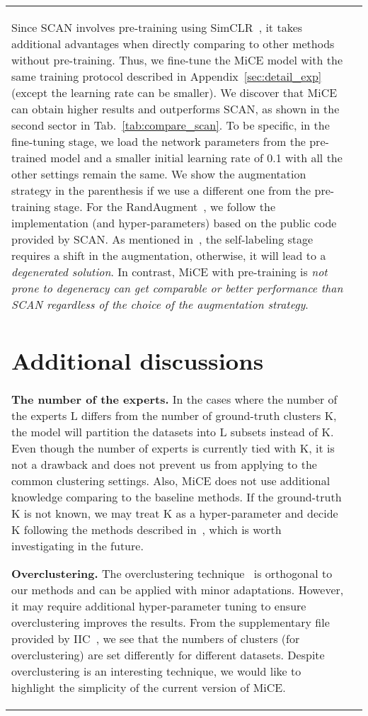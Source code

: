 \documentclass{article} \usepackage{iclr2021_conference,times}
\begin{document}
\begin{table}[t]
\begin{subtable}[h]{0.49\textwidth}
{\begin{tabular}{@{}lc@{}}
Since SCAN involves pre-training using SimCLR~\citep{chen2020simple}, it takes additional advantages when directly comparing to other methods without pre-training. Thus, we fine-tune the MiCE model with the same training protocol described in Appendix~\ref{sec:detail_exp} (except the learning rate can be smaller). We discover that MiCE can obtain higher results and outperforms SCAN, as shown in the second sector in Tab.~\ref{tab:compare_scan}. To be specific, in the fine-tuning stage, we load the network parameters from the pre-trained model and a smaller initial learning rate of 0.1 with all the other settings remain the same. We show the augmentation strategy in the parenthesis if we use a different one from the pre-training stage. For the RandAugment~\citep{cubuk2020randaugment}, we follow the implementation (and hyper-parameters) based on the public code provided by SCAN. As mentioned in~\citet{van2020scan}, the self-labeling stage requires a shift in the augmentation, otherwise, it will lead to a \textit{degenerated solution}. In contrast, MiCE with pre-training is \textit{not prone to degeneracy can get comparable or better performance than SCAN regardless of the choice of the augmentation strategy}.












\section{Additional discussions}

{\bf The number of the experts.} In the cases where the number of the experts L differs from the number of ground-truth clusters K, the model will partition the datasets into L subsets instead of K. Even though the number of experts is currently tied with K, it is not a drawback and does not prevent us from applying to the common clustering settings. Also, MiCE does not use additional knowledge comparing to the baseline methods. If the ground-truth K is not known, we may treat K as a hyper-parameter and decide K following the methods described in~\citet{smyth2000model,mclachlan2004finite}, which is worth investigating in the future.

{\bf Overclustering.} The overclustering technique~\citep{ji2019invariant} is orthogonal to our methods and can be applied with minor adaptations. However, it may require additional hyper-parameter tuning to ensure overclustering improves the results. From the supplementary file provided by IIC~\citep{ji2019invariant}, we see that the numbers of clusters (for overclustering) are set differently for different datasets. Despite overclustering is an interesting technique, we would like to highlight the simplicity of the current version of MiCE.  


\end{tabular}}
\end{subtable}
\end{table}
\end{document}
